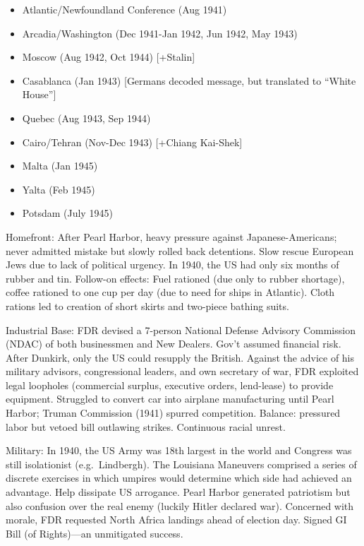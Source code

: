 \documentclass[
]{article}
\begin{document}
\begin{itemize}
\item
  Atlantic/Newfoundland Conference (Aug 1941)
\item
  Arcadia/Washington (Dec 1941-Jan 1942, Jun 1942, May 1943)
\item
  Moscow (Aug 1942, Oct 1944) {[}+Stalin{]}
\item
  Casablanca (Jan 1943) {[}Germans decoded message, but translated to
  ``White House''{]}
\item
  Quebec (Aug 1943, Sep 1944)
\item
  Cairo/Tehran (Nov-Dec 1943) {[}+Chiang Kai-Shek{]}
\item
  Malta (Jan 1945)
\item
  Yalta (Feb 1945)
\item
  Potsdam (July 1945)
\end{itemize}

Homefront: After Pearl Harbor, heavy pressure against
Japanese-Americans; never admitted mistake but slowly rolled back
detentions. Slow rescue European Jews due to lack of political urgency.
In 1940, the US had only six months of rubber and tin. Follow-on
effects: Fuel rationed (due only to rubber shortage), coffee rationed to
one cup per day (due to need for ships in Atlantic). Cloth rations led
to creation of short skirts and two-piece bathing suits.

Industrial Base: FDR devised a 7-person National Defense Advisory
Commission (NDAC) of both businessmen and New Dealers. Gov't assumed
financial risk. After Dunkirk, only the US could resupply the British.
Against the advice of his military advisors, congressional leaders, and
own secretary of war, FDR exploited legal loopholes (commercial surplus,
executive orders, lend-lease) to provide equipment. Struggled to convert
car into airplane manufacturing until Pearl Harbor; Truman Commission
(1941) spurred competition. Balance: pressured labor but vetoed bill
outlawing strikes. Continuous racial unrest.

Military: In 1940, the US Army was 18th largest in the world and
Congress was still isolationist (e.g.~Lindbergh). The Louisiana
Maneuvers comprised a series of discrete exercises in which umpires
would determine which side had achieved an advantage. Help dissipate US
arrogance. Pearl Harbor generated patriotism but also confusion over the
real enemy (luckily Hitler declared war). Concerned with morale, FDR
requested North Africa landings ahead of election day. Signed GI Bill
(of Rights)---an unmitigated success.
\end{document}
